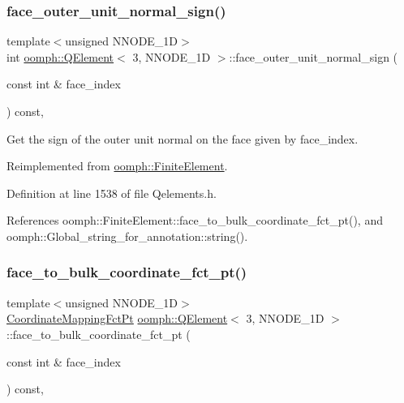 \subsubsection{\texorpdfstring{face\+\_\+outer\+\_\+unit\+\_\+normal\+\_\+sign()}{face\_outer\_unit\_normal\_sign()}}
{\footnotesize\ttfamily template$<$unsigned N\+N\+O\+D\+E\+\_\+1D$>$ \\
int \hyperlink{classoomph_1_1QElement}{oomph\+::\+Q\+Element}$<$ 3, N\+N\+O\+D\+E\+\_\+1D $>$\+::face\+\_\+outer\+\_\+unit\+\_\+normal\+\_\+sign (\begin{DoxyParamCaption}\item[{const int \&}]{face\+\_\+index }\end{DoxyParamCaption}) const\hspace{0.3cm}{\ttfamily [inline]}, {\ttfamily [virtual]}}



Get the sign of the outer unit normal on the face given by face\+\_\+index. 



Reimplemented from \hyperlink{classoomph_1_1FiniteElement_a09ec977bcf493ec78b6979a38d83bb2c}{oomph\+::\+Finite\+Element}.



Definition at line 1538 of file Qelements.\+h.



References oomph\+::\+Finite\+Element\+::face\+\_\+to\+\_\+bulk\+\_\+coordinate\+\_\+fct\+\_\+pt(), and oomph\+::\+Global\+\_\+string\+\_\+for\+\_\+annotation\+::string().

\mbox{\label{classoomph_1_1QElement_3_013_00_01NNODE__1D_01_4_a6803c44633cc3fccaddbfa7c3077adbb}} 
\subsubsection{\texorpdfstring{face\+\_\+to\+\_\+bulk\+\_\+coordinate\+\_\+fct\+\_\+pt()}{face\_to\_bulk\_coordinate\_fct\_pt()}}
{\footnotesize\ttfamily template$<$unsigned N\+N\+O\+D\+E\+\_\+1D$>$ \\
\hyperlink{namespaceoomph_afa5c7a93cae1917e874b392601be0bde}{Coordinate\+Mapping\+Fct\+Pt} \hyperlink{classoomph_1_1QElement}{oomph\+::\+Q\+Element}$<$ 3, N\+N\+O\+D\+E\+\_\+1D $>$\+::face\+\_\+to\+\_\+bulk\+\_\+coordinate\+\_\+fct\+\_\+pt (\begin{DoxyParamCaption}\item[{const int \&}]{face\+\_\+index }\end{DoxyParamCaption}) const\hspace{0.3cm}{\ttfamily [inline]}, {\ttfamily [virtual]}}



